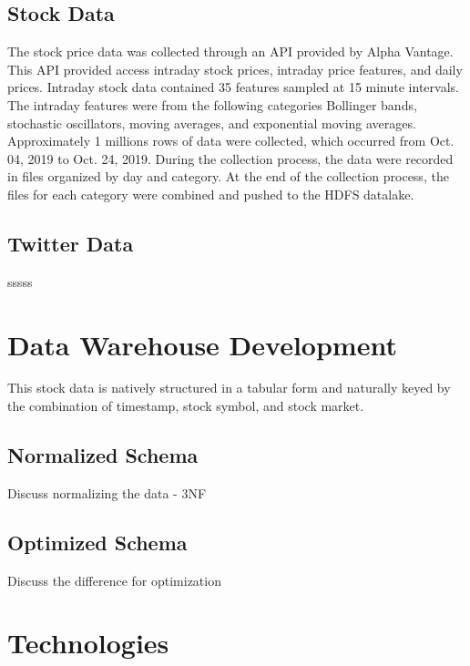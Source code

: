 \documentclass[journal]{IEEEtran}
\begin{document}
\subsection{Stock Data}

The stock price data was collected through an API provided by Alpha Vantage.
This API provided access intraday stock prices, intraday price features, and daily prices.
Intraday stock data contained 35 features sampled at 15 minute intervals. 
The intraday features were from the following categories Bollinger bands, stochastic oscillators, moving averages, and exponential moving averages.
Approximately 1 millions rows of data were collected, which occurred from Oct. 04, 2019 to Oct. 24, 2019.
During the collection process, the data were recorded in files organized by day and category.
At the end of the collection process, the files for each category were combined and pushed to the HDFS datalake.


\subsection{Twitter Data}

sssss

\section{Data Warehouse Development}

This stock data is natively structured in a tabular form and naturally keyed by the combination of timestamp, stock symbol, and stock market.

\subsection{Normalized Schema}


Discuss normalizing the data - 3NF

\subsection{Optimized Schema}

Discuss the difference for optimization

\section{Technologies}
\end{document}
